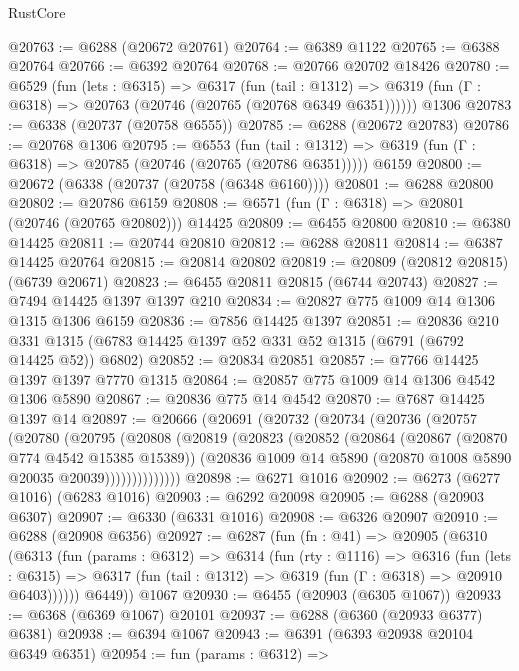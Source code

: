 \begin{lexlean}{RustCore}
\begin{coremodule}
@20763 := @6288 (@20672 @20761)
@20764 := @6389 @1122
@20765 := @6388 @20764
@20766 := @6392 @20764
@20768 := @20766 @20702 @18426
@20780 := @6529
    (fun (lets : @6315) =>
    @6317
      (fun (tail : @1312) =>
      @6319 (fun (Γ : @6318) => @20763 (@20746 (@20765 (@20768 @6349 @6351))))))
    @1306
@20783 := @6338 (@20737 (@20758 @6555))
@20785 := @6288 (@20672 @20783)
@20786 := @20768 @1306
@20795 := @6553
    (fun (tail : @1312) => @6319 (fun (Γ : @6318) => @20785 (@20746 (@20765 (@20786 @6351)))))
    @6159
@20800 := @20672 (@6338 (@20737 (@20758 (@6348 @6160))))
@20801 := @6288 @20800
@20802 := @20786 @6159
@20808 := @6571 (fun (Γ : @6318) => @20801 (@20746 (@20765 @20802))) @14425
@20809 := @6455 @20800
@20810 := @6380 @14425
@20811 := @20744 @20810
@20812 := @6288 @20811
@20814 := @6387 @14425 @20764
@20815 := @20814 @20802
@20819 := @20809 (@20812 @20815) (@6739 @20671)
@20823 := @6455 @20811 @20815 (@6744 @20743)
@20827 := @7494 @14425 @1397 @1397 @210
@20834 := @20827 @775 @1009 @14 @1306 @1315 @1306 @6159
@20836 := @7856 @14425 @1397
@20851 := @20836
    @210
    @331
    @1315
    (@6783 @14425 @1397 @52 @331 @52 @1315 (@6791 (@6792 @14425 @52)) @6802)
@20852 := @20834 @20851
@20857 := @7766 @14425 @1397 @1397 @7770 @1315
@20864 := @20857 @775 @1009 @14 @1306 @4542 @1306 @5890
@20867 := @20836 @775 @14 @4542
@20870 := @7687 @14425 @1397 @14
@20897 := @20666
    (@20691
      (@20732
        (@20734
          (@20736
            (@20757
              (@20780
                (@20795
                  (@20808
                    (@20819
                      (@20823
                        (@20852
                          (@20864
                            (@20867 (@20870 @774 @4542 @15385 @15389))
                            (@20836 @1009 @14 @5890 (@20870 @1008 @5890 @20035 @20039))))))))))))))
@20898 := @6271 @1016
@20902 := @6273 (@6277 @1016) (@6283 @1016)
@20903 := @6292 @20098
@20905 := @6288 (@20903 @6307)
@20907 := @6330 (@6331 @1016)
@20908 := @6326 @20907
@20910 := @6288 (@20908 @6356)
@20927 := @6287
    (fun (fn : @41) =>
    @20905
      (@6310
        (@6313
          (fun (params : @6312) =>
          @6314
            (fun (rty : @1116) =>
            @6316
              (fun (lets : @6315) =>
              @6317 (fun (tail : @1312) => @6319 (fun (Γ : @6318) => @20910 @6403))))))
        @6449))
    @1067
@20930 := @6455 (@20903 (@6305 @1067))
@20933 := @6368 (@6369 @1067) @20101
@20937 := @6288 (@6360 (@20933 @6377) @6381)
@20938 := @6394 @1067
@20943 := @6391 (@6393 @20938 @20104 @6349 @6351)
@20954 := fun (params : @6312) =>

\end{coremodule}
\end{lexlean}
